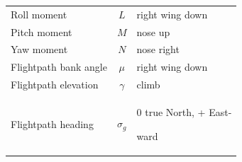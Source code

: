 \documentclass[
]{book}
\begin{document}
\begin{longtable}[]{@{}lcl@{}}
\begin{minipage}[t]{0.56\columnwidth}
Roll moment\strut
\end{minipage} & \begin{minipage}[t]{0.12\columnwidth}\centering
\(L\)\strut
\end{minipage} & \begin{minipage}[t]{0.23\columnwidth}\raggedright
right wing down\strut
\end{minipage}\tabularnewline
\begin{minipage}[t]{0.56\columnwidth}\raggedright
Pitch moment\strut
\end{minipage} & \begin{minipage}[t]{0.12\columnwidth}\centering
\(M\)\strut
\end{minipage} & \begin{minipage}[t]{0.23\columnwidth}\raggedright
nose up\strut
\end{minipage}\tabularnewline
\begin{minipage}[t]{0.56\columnwidth}\raggedright
Yaw moment\strut
\end{minipage} & \begin{minipage}[t]{0.12\columnwidth}\centering
\(N\)\strut
\end{minipage} & \begin{minipage}[t]{0.23\columnwidth}\raggedright
nose right\strut
\end{minipage}\tabularnewline
\begin{minipage}[t]{0.56\columnwidth}\raggedright
Flightpath bank angle\strut
\end{minipage} & \begin{minipage}[t]{0.12\columnwidth}\centering
\(\mu\)\strut
\end{minipage} & \begin{minipage}[t]{0.23\columnwidth}\raggedright
right wing down\strut
\end{minipage}\tabularnewline
\begin{minipage}[t]{0.56\columnwidth}\raggedright
Flightpath elevation\strut
\end{minipage} & \begin{minipage}[t]{0.12\columnwidth}\centering
\(\gamma\)\strut
\end{minipage} & \begin{minipage}[t]{0.23\columnwidth}\raggedright
climb\strut
\end{minipage}\tabularnewline
\begin{minipage}[t]{0.56\columnwidth}\raggedright
Flightpath heading\strut
\end{minipage} & \begin{minipage}[t]{0.12\columnwidth}\centering
\(\sigma_g\)\strut
\end{minipage} & \begin{minipage}[t]{0.23\columnwidth}\raggedright
0 true North, + East-

ward\strut
\end{minipage}\tabularnewline
\bottomrule
\end{longtable}
\end{document}
